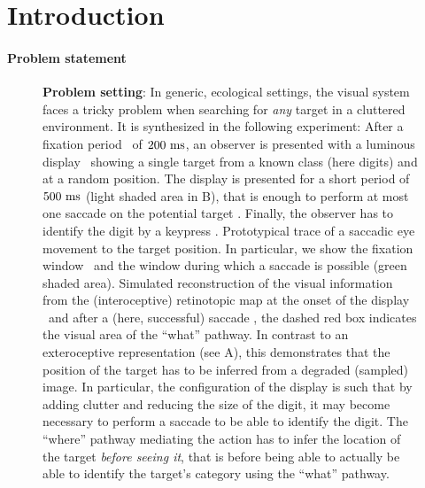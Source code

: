 \section{Introduction}
\label{sec:intro}
\paragraph{Problem statement}
\begin{figure}[b!]%
	\caption{%
		{\bf Problem setting}: In generic, ecological settings, the visual system faces a tricky problem when searching for \emph{any} target in a cluttered environment. It is synthesized in the following experiment: %
		\A After a fixation period \FIX\ of $200~\si{\milli\second}$, an observer is presented with a luminous display \DIS\ showing a single target from a known class (here digits) and at a random position. The display is presented for a short period of $500~\si{\milli\second}$ (light shaded area in B), that is enough to perform at most one saccade on the potential target \SAC . Finally, the observer has to identify the digit by a keypress \ANS . %
		\B Prototypical trace of a saccadic eye movement to the target position. In particular, we show the fixation window \FIX\ and the window during which a saccade is possible (green shaded area). %
		\C Simulated reconstruction of the visual information from the (interoceptive) retinotopic map at the onset of the display \DIS\ and after a (here, successful) saccade \SAC , the dashed red box indicates the visual area of the ``what'' pathway. In contrast to an exteroceptive representation (see A), this demonstrates that the position of the target has to be inferred from a degraded (sampled) image. In particular, the configuration of the display is such that by adding clutter and reducing the size of the digit, it may become necessary to perform a saccade to be able to identify the digit. The ``where'' pathway mediating the action has to infer the location of the target \emph{before seeing it}, that is before being able to actually be able to identify the target's category using the ``what'' pathway. %
		\label{fig:intro}}%
\end{figure}%

